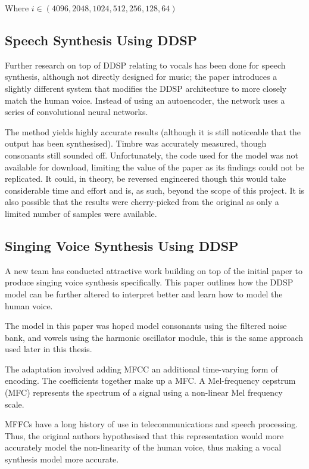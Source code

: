 Where $i \in (4096, 2048, 1024, 512, 256, 128, 64)$

\subsection{Speech Synthesis Using DDSP}

Further research on top of DDSP relating to vocals has been done for speech synthesis, although not directly designed for music; the paper introduces a slightly different system that modifies the DDSP architecture to more closely match the human voice\cite{SpeechDDSP}. Instead of using an autoencoder, the network uses a series of convolutional neural networks.

The method yields highly accurate results (although it is still noticeable that the output has been synthesised). Timbre was accurately measured, though consonants still sounded off. Unfortunately, the code used for the model was not available for download, limiting the value of the paper as its findings could not be replicated. It could, in theory, be reversed engineered though this would take considerable time and effort and is, as such, beyond the scope of this project. It is also possible that the results were cherry-picked from the original as only a limited number of samples were available.

\subsection{Singing Voice Synthesis Using DDSP}
\label{sec:singing_voice_synthesis}

A new team has conducted attractive work building on top of the initial paper to produce singing voice synthesis\cite{SingingDDSP} specifically. This paper outlines how the DDSP model can be further altered to interpret better and learn how to model the human voice.

The model in this paper was hoped model consonants using the filtered noise bank, and vowels using the harmonic oscillator module, this is the same approach used later in this thesis.

The adaptation involved adding \acrfull{MFCC} an additional time-varying form of encoding. The coefficients together make up a \acrfull{MFC}. A Mel-frequency cepstrum (MFC) represents the spectrum of a signal using a non-linear Mel frequency scale.

MFFCs have a long history of use in telecommunications and speech processing\cite{MFCCHistory}. Thus, the original authors hypothesised that this representation would more accurately model the non-linearity of the human voice, thus making a vocal synthesis model more accurate.

